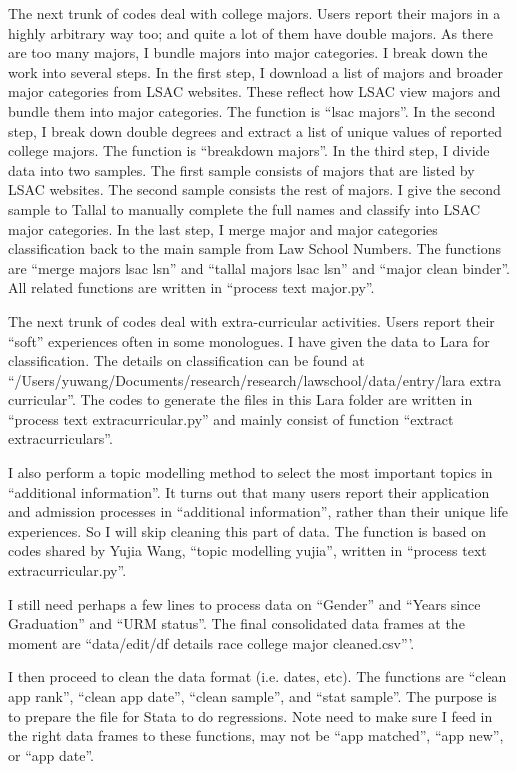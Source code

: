 \documentclass[12pt]{article}
\begin{document}
The next trunk of codes deal with college majors. Users report their majors in a highly arbitrary way too; and quite a lot of them have double majors. As there are too many majors, I bundle majors into major categories. I break down the work into several steps. In the first step, I download a list of majors and broader major categories from LSAC websites. These reflect how LSAC view majors and bundle them into major categories. The function is ``lsac majors''. In the second step, I break down double degrees and extract a list of unique values of reported college majors. The function is ``breakdown majors''. In the third step, I divide data into two samples. The first sample consists of majors that are listed by LSAC websites. The second sample consists the rest of majors. I give the second sample to Tallal to manually complete the full names and classify into LSAC major categories. In the last step, I merge major and major categories classification back to the main sample from Law School Numbers. The functions are ``merge majors lsac lsn'' and ``tallal majors lsac lsn'' and ``major clean binder''. All related functions are written in ``process text major.py''.

The next trunk of codes deal with extra-curricular activities. Users report their ``soft'' experiences often in some monologues. I have given the data to Lara for classification. The details on classification can be found at ``/Users/yuwang/Documents/research/research/lawschool/data/entry/lara extra curricular''. The codes to generate the files in this Lara folder are written in ``process text extracurricular.py'' and mainly consist of function ``extract extracurriculars''.

I also perform a topic modelling method to select the most important topics in ``additional information''. It turns out that many users report their application and admission processes in ``additional information'', rather than their unique life experiences. So I will skip cleaning this part of data. The function is based on codes shared by Yujia Wang, ``topic modelling yujia'', written in ``process text extracurricular.py''. 

I still need perhaps a few lines to process data on ``Gender'' and ``Years since Graduation'' and ``URM status''. The final consolidated data frames at the moment are ``data/edit/df details race college major cleaned.csv'''.

I then proceed to clean the data format (i.e. dates, etc). The functions are ``clean app rank'', ``clean app date'', ``clean sample'', and ``stat sample''. The purpose is to prepare the file for Stata to do regressions. Note need to make sure I feed in the right data frames to these functions, may not be ``app matched'', ``app new'', or ``app date''. 
\end{document}
